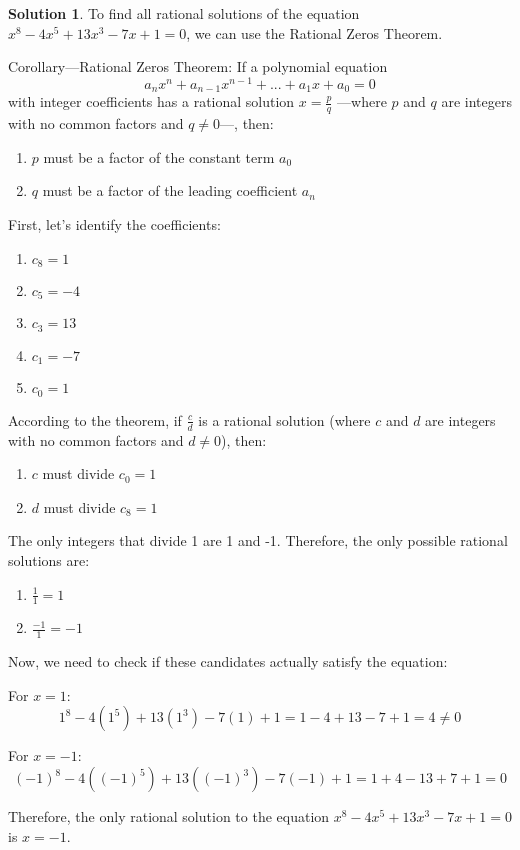 \documentclass[12pt]{article}
\theoremstyle{definition} %
\newtheorem{solution}{Solution}
\theoremstyle{plain} %
\begin{document}
\begin{solution}
    To find all rational solutions of the equation $x^8-4x^5+13x^3-7x+1=0$, we can use the Rational Zeros Theorem.

Corollary—Rational Zeros Theorem: If a polynomial equation 
$$
a_nx^n + a_{n-1}x^{n-1} + ... + a_1x + a_0 = 0
$$
with integer coefficients has a rational solution $x = \frac{p}{q}$ 
—where $p$ and $q$ are integers with no common factors and $q \neq 0$—, then:
\begin{enumerate}
    \item $p$ must be a factor of the constant term $a_0$
    \item $q$ must be a factor of the leading coefficient $a_n$
\end{enumerate}

First, let's identify the coefficients:
\begin{enumerate}
    \item $c_8 = 1$
    \item $c_5 = -4$
    \item $c_3 = 13$
    \item $c_1 = -7$
    \item $c_0 = 1$
\end{enumerate}

According to the theorem, if $\frac{c}{d}$ is a rational solution (where $c$ and $d$ are integers with no common factors and $d \neq 0$), then:
\begin{enumerate}
    \item $c$ must divide $c_0 = 1$
    \item $d$ must divide $c_8 = 1$
\end{enumerate}

The only integers that divide 1 are 1 and -1. Therefore, the only possible rational solutions are:
\begin{enumerate}
    \item $\frac{1}{1} = 1$
    \item $\frac{-1}{1} = -1$
\end{enumerate}

Now, we need to check if these candidates actually satisfy the equation:

For $x = 1$:
$$
1^8 - 4(1^5) + 13(1^3) - 7(1) + 1 = 1 - 4 + 13 - 7 + 1 = 4 \neq 0
$$

For $x = -1$:
$$
(-1)^8 - 4((-1)^5) + 13((-1)^3) - 7(-1) + 1 = 1 + 4 - 13 + 7 + 1 = 0
$$

Therefore, the only rational solution to the equation $x^8-4x^5+13x^3-7x+1=0$ is $x = -1$.
\end{solution}
\end{document}
